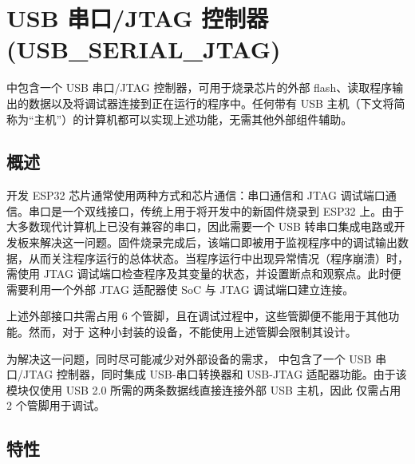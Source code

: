 \documentclass[main\_\_CN.tex]{subfiles}
\begin{document}

\ifglobal
\else
    {\let\clearpage\relax \listoftodos}
    \tableofcontents
\fi



\chapter{USB 串口/JTAG 控制器 (USB\_SERIAL\_JTAG)}
\label{mod:usbserialjtag}
\hypertarget{usbserialjtag}{}


\chipname{} 中包含一个 USB 串口/JTAG 控制器，可用于烧录芯片的外部 flash、读取程序输出的数据以及将调试器连接到正在运行的程序中。任何带有 USB 主机（下文将简称为“主机”）的计算机都可以实现上述功能，无需其他外部组件辅助。

\section{概述}

开发 ESP32 芯片通常使用两种方式和芯片通信：串口通信和 JTAG 调试端口通信。串口是一个双线接口，传统上用于将开发中的新固件烧录到 ESP32 上。由于大多数现代计算机上已没有兼容的串口，因此需要一个 USB 转串口集成电路或开发板来解决这一问题。固件烧录完成后，该端口即被用于监视程序中的调试输出数据，从而关注程序运行的总体状态。当程序运行中出现异常情况（程序崩溃）时，需使用 JTAG 调试端口检查程序及其变量的状态，并设置断点和观察点。此时便需要利用一个外部 JTAG 适配器使 SoC 与 JTAG 调试端口建立连接。

上述外部接口共需占用 6 个管脚，且在调试过程中，这些管脚便不能用于其他功能。然而，对于 \chipname{} 这种小封装的设备，不能使用上述管脚会限制其设计。

为解决这一问题，同时尽可能减少对外部设备的需求，\chipname{} 中包含了一个 USB 串口/JTAG 控制器，同时集成 USB-串口转换器和 USB-JTAG 适配器功能。由于该模块仅使用 USB 2.0 所需的两条数据线直接连接外部 USB 主机，因此 \chipname{} 仅需占用 2 个管脚用于调试。


\section{特性}
\label{sec:usbserialjtag-features}
\end{document}
